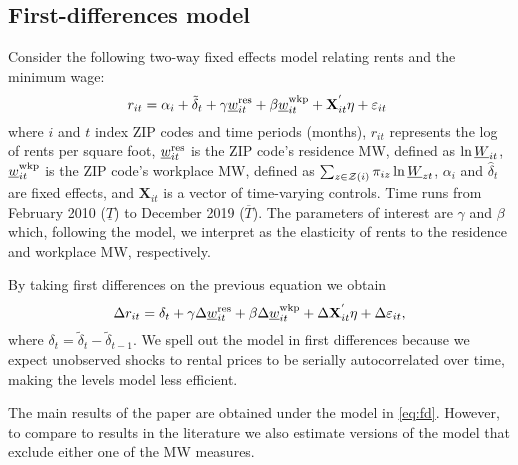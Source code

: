     
\subsection{First-differences model}

Consider the following two-way fixed effects model relating rents and the 
minimum wage:
\begin{equation*} \label{eq:did_lev}
    r_{it} = \alpha_i + \tilde{\delta}_t 
           + \gamma \underline{w}^{\text{res}}_{it} + \beta \underline{w}^{\text{wkp}}_{it}
           + \mathbf{X}^{'}_{it}\eta
           + \varepsilon_{it} \ 
\end{equation*}    
where
$i$ and $t$ index ZIP codes and time periods (months),
$r_{it}$ represents the log of rents per square foot,
$\underline{w}^{\text{res}}_{it}$ is the ZIP code's residence MW, defined as 
$\ln \underline{W}_{it}$,
$\underline{w}^{\text{wkp}}_{it}$ is the ZIP code's workplace MW, defined as 
$\sum_{z\in\mathcal{Z}(i)} \pi_{iz}\ln \underline{W}_{zt}$,
$\alpha_i$ and $\hat{\delta}_t$ are fixed effects, and 
$\mathbf{X}_{it}$ is a vector of time-varying controls.
Time runs from February 2010 ($\underline{T}$) to December 2019 ($\overline{T}$).
The parameters of interest are $\gamma$ and $\beta$ which, following the model, 
we interpret as the elasticity of rents to the residence and workplace MW, 
respectively.

By taking first differences on the previous equation we obtain
\begin{equation}\label{eq:fd}
    \Delta r_{it} = \delta_t
                  + \gamma \Delta \underline{w}^{\text{res}}_{it} + \beta \Delta \underline{w}^{\text{wkp}}_{it}
                  + \Delta \mathbf{X}^{'}_{it}\eta
                  + \Delta \varepsilon_{it} ,
\end{equation}
where $\delta_t = \tilde{\delta}_t - \tilde{\delta}_{t-1}$.
We spell out the model in first differences because we expect unobserved shocks 
to rental prices to be serially autocorrelated over time, making the levels
model less efficient.

The main results of the paper are obtained under the model in \eqref{eq:fd}. 
However, to compare to results in the literature we also estimate versions of 
the model that exclude either one of the MW measures.


